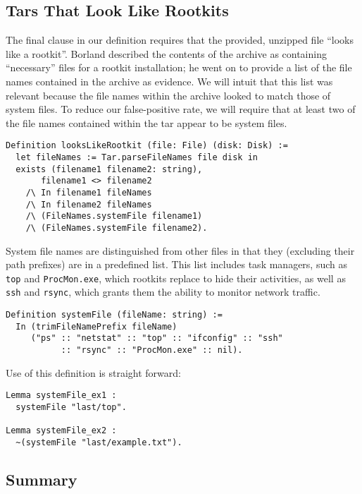 \documentclass[nocopyrightspace]{sigplanconf}
\begin{document}
\subsection{Tars That Look Like Rootkits}

The final clause in our definition requires that the provided, unzipped file
``looks like a rootkit''. Borland described the contents of the archive as
containing ``necessary'' files for a rootkit installation; he went on to
provide a list of the file names contained in the archive as evidence. We will
intuit that this list was relevant because the file names within the archive
looked to match those of system files. To reduce our false-positive rate, we
will require that at least two of the file names contained within the tar
appear to be system files.

\begin{lstlisting}
Definition looksLikeRootkit (file: File) (disk: Disk) :=
  let fileNames := Tar.parseFileNames file disk in
  exists (filename1 filename2: string),
       filename1 <> filename2
    /\ In filename1 fileNames
    /\ In filename2 fileNames
    /\ (FileNames.systemFile filename1)
    /\ (FileNames.systemFile filename2).
\end{lstlisting}

System file names are distinguished from other files in that they (excluding
their path prefixes) are in a predefined list. This list includes task
managers, such as {\tt top} and {\tt ProcMon.exe}, which rootkits replace to
hide their activities, as well as {\tt ssh} and {\tt rsync}, which grants them
the ability to monitor network traffic.

\begin{lstlisting}
Definition systemFile (fileName: string) :=
  In (trimFileNamePrefix fileName)
     ("ps" :: "netstat" :: "top" :: "ifconfig" :: "ssh"
           :: "rsync" :: "ProcMon.exe" :: nil).
\end{lstlisting}

Use of this definition is straight forward:

\begin{lstlisting}
Lemma systemFile_ex1 : 
  systemFile "last/top".

Lemma systemFile_ex2 : 
  ~(systemFile "last/example.txt").
\end{lstlisting}

\subsection{Summary}
\end{document}
